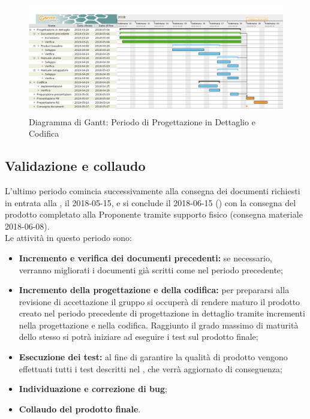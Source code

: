             \begin{figure}[H]
                \centering
                \includegraphics[width=1\linewidth, height=5cm]{./img/Gantt/ProgettazioneDettaglio.png}
                \caption[Gantt - Progettazione in dettaglio e codifica]{Diagramma di Gantt: Periodo di Progettazione in Dettaglio e Codifica}
            \end{figure}

	\newpage
	
	
	\subsection{Validazione e collaudo}
	\label{pianificazioneValidazione}
		L'ultimo periodo comincia successivamente alla consegna dei documenti
		richiesti in entrata alla \RQ{}, il 2018-05-15, e 
		si conclude il 2018-06-15 (\RA{}) con la consegna del prodotto completato 
		alla Proponente tramite supporto fisico (consegna materiale  2018-06-08). \\
		Le attività in questo periodo sono:

            \begin{itemize}
                \item \textbf{Incremento e verifica dei documenti precedenti:}
                    se necessario, verranno migliorati i documenti già scritti come
                    nel periodo precedente;
                \item \textbf{Incremento della progettazione e della codifica:}
                	per prepararsi alla revisione di accettazione il gruppo si occuperà di rendere
                	maturo il prodotto creato nel periodo precedente di progettazione in dettaglio
                	tramite incrementi nella progettazione e nella codifica. Raggiunto il grado massimo
                	di maturità dello stesso si potrà iniziare ad eseguire i test sul prodotto finale;
                \item \textbf{Esecuzione dei test:}
                    al fine di garantire la qualità di prodotto vengono effettuati
                    tutti i test descritti nel \PianoQualifica{}, che verrà aggiornato
                    di conseguenza;
                \item \textbf{Individuazione e correzione di bug};
                \item \textbf{Collaudo del prodotto finale}.
            \end{itemize}
	
